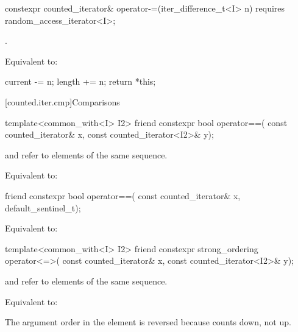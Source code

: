 %
\begin{itemdecl}
constexpr counted_iterator& operator-=(iter_difference_t<I> n)
  requires random_access_iterator<I>;
\end{itemdecl}

\begin{itemdescr}
\pnum
\expects
{}.

\pnum
\effects
Equivalent to:
\begin{codeblock}
current -= n;
length += n;
return *this;
\end{codeblock}
\end{itemdescr}

[counted.iter.cmp]{Comparisons}

%
\begin{itemdecl}
template<common_with<I> I2>
  friend constexpr bool operator==(
    const counted_iterator& x, const counted_iterator<I2>& y);
\end{itemdecl}

\begin{itemdescr}
\pnum
\expects
{} and  refer to
elements of the same sequence.

\pnum
\effects
Equivalent to: 
\end{itemdescr}

%
\begin{itemdecl}
friend constexpr bool operator==(
  const counted_iterator& x, default_sentinel_t);
\end{itemdecl}

\begin{itemdescr}
\pnum
\effects
Equivalent to: 
\end{itemdescr}

%
\begin{itemdecl}
template<common_with<I> I2>
  friend constexpr strong_ordering operator<=>(
    const counted_iterator& x, const counted_iterator<I2>& y);
\end{itemdecl}

\begin{itemdescr}
\pnum
\expects
{} and  refer to
elements of the same sequence.

\pnum
\effects
Equivalent to: 

\pnum
\begin{note}
The argument order in the \effects element is reversed
because  counts down, not up.
\end{note}
\end{itemdescr}

